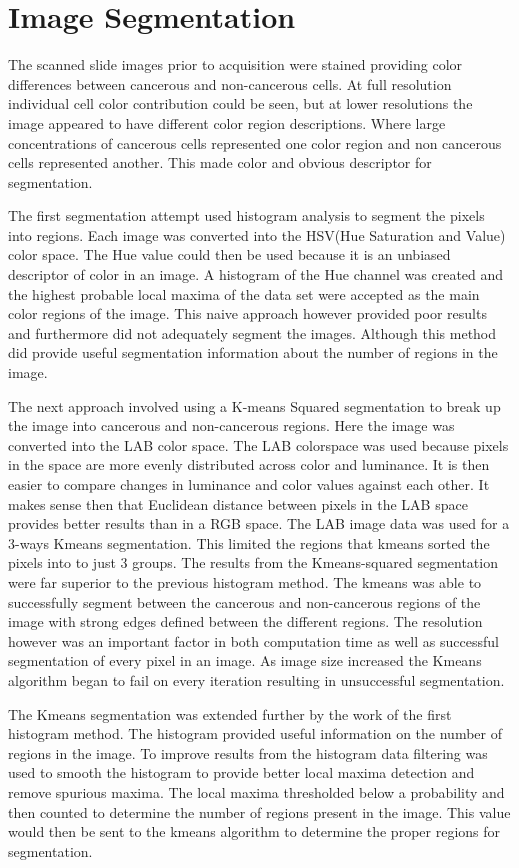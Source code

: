 \documentclass[a4paper,10pt,oneside]{article}
\begin{document}
\section{Image Segmentation}
The scanned slide images prior to acquisition were stained providing color differences between cancerous and non-cancerous cells. At full resolution individual cell color contribution could be seen, but at lower resolutions the image appeared to have different color region descriptions. Where large concentrations of cancerous cells represented one color region and non cancerous cells represented another. This made color and obvious descriptor for segmentation.

The first segmentation attempt used histogram analysis to segment the pixels into regions. Each image was converted into the HSV(Hue Saturation and Value) color space. The Hue value could then be used because it is an unbiased descriptor of color in an image. A histogram of the Hue channel was created and the highest probable local maxima of the data set were accepted as the main color regions of the image. This naive approach however provided poor results and furthermore did not adequately segment the images. Although this method did provide useful segmentation information about the number of regions in the image.

The next approach involved using a K-means Squared segmentation to break up the image into cancerous and non-cancerous regions. Here the image was converted into the LAB color space. The LAB colorspace was used because pixels in the space are more evenly distributed across color and luminance. It is then easier to compare changes in luminance and color values against each other. It makes sense then that Euclidean distance between pixels in the LAB space provides better results than in a RGB space. The LAB image data was used for a 3-ways Kmeans segmentation. This limited the regions that kmeans sorted the pixels into to just 3 groups. The results from the Kmeans-squared segmentation were far superior to the previous histogram method. The kmeans was able to successfully segment between the cancerous and non-cancerous regions of the image with strong edges defined between the different regions. The resolution however was an important factor in both computation time as well as successful segmentation of every pixel in an image. As image size increased the Kmeans algorithm began to fail on every iteration resulting in unsuccessful segmentation.

The Kmeans segmentation was extended further by the work of the first histogram method. The histogram provided useful information on the number of regions in the image. To improve results from the histogram data filtering was used to smooth the histogram to provide better local maxima detection and remove spurious maxima. The local maxima thresholded below a probability and then counted to determine the number of regions present in the image. This value would then be sent to the kmeans algorithm to determine the proper regions for segmentation.
\end{document}
